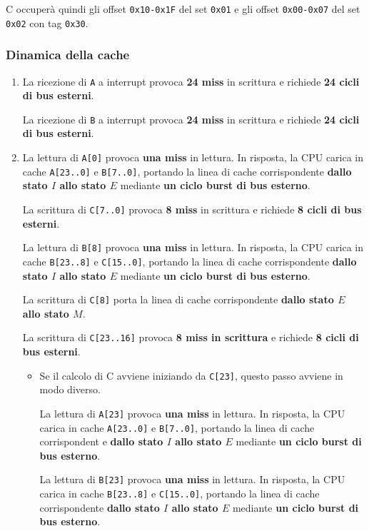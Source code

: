 \documentclass[a4paper]{article}
\begin{document}
C occuperà quindi gli offset \texttt{0x10-0x1F} del set \texttt{0x01} e gli offset \texttt{0x00-0x07} del set \texttt{0x02} con tag \texttt{0x30}.


\subsubsection{Dinamica della cache}
\begin{enumerate}
\item La ricezione di \texttt{A} a interrupt provoca \textbf{24 miss} in scrittura e richiede \textbf{24 cicli di bus esterni}.

La ricezione di \texttt{B} a interrupt provoca \textbf{24 miss} in scrittura e richiede \textbf{24 cicli di bus esterni}.

\item La lettura di \texttt{A[0]} provoca \textbf{una miss} in lettura.
In risposta, la CPU carica in cache \texttt{A[23..0]} e \texttt{B[7..0]}, portando la linea di cache corrispondente \textbf{dallo stato $I$ allo stato $E$} mediante \textbf{un ciclo burst di bus esterno}.

La scrittura di \texttt{C[7..0]} provoca \textbf{8 miss} in scrittura e richiede \textbf{8 cicli di bus esterni}. 

La lettura di \texttt{B[8]} provoca \textbf{una miss} in lettura.
In risposta, la CPU carica in cache \texttt{B[23..8]} e \texttt{C[15..0]}, portando la linea di cache corrispondente \textbf{dallo stato $I$ allo stato $E$} mediante \textbf{un ciclo burst di bus esterno}.

La scrittura di \texttt{C[8]} porta la linea di cache corrispondente \textbf{dallo stato $E$ allo stato $M$}.

La scrittura di \texttt{C[23..16]} provoca \textbf{8 miss in scrittura} e richiede \textbf{8 cicli di bus esterni}.

\begin{itemize}
\item Se il calcolo di C avviene iniziando da \texttt{C[23]}, questo passo avviene in modo diverso.

La lettura di \texttt{A[23]}  provoca \textbf{una miss} in lettura.
In risposta, la CPU carica in cache \texttt{A[23..0]} e \texttt{B[7..0]}, portando la linea di cache corrispondent
e \textbf{dallo stato $I$ allo stato $E$} mediante \textbf{un ciclo burst di bus esterno}.

La lettura di \texttt{B[23]} provoca \textbf{una miss} in lettura.
In risposta, la CPU carica in cache \texttt{B[23..8]} e \texttt{C[15..0]}, portando la linea di cache corrispondente \textbf{dallo stato $I$ allo stato $E$} mediante \textbf{un ciclo burst di bus esterno}.


\end{itemize}
\end{enumerate}
\end{document}

